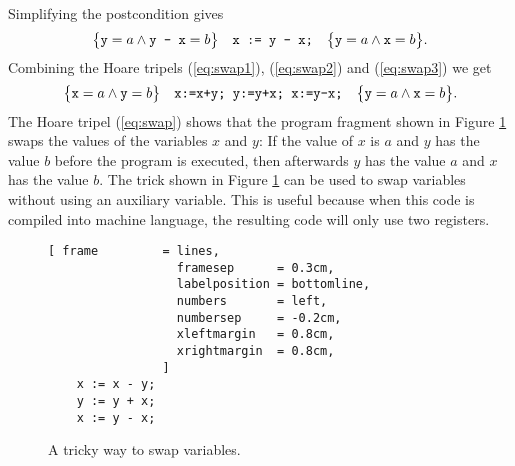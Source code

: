 Simplifying the postcondition gives
\begin{equation}
  \label{eq:swap3}
  \bigl\{\texttt{y} = a \wedge \texttt{y - x} = b\bigr\}\quad\texttt{x := y - x;}\quad\bigl\{ \texttt{y} = a \wedge \texttt{x} = b\bigr\}.   
\end{equation}
Combining the Hoare tripels (\ref{eq:swap1}), (\ref{eq:swap2}) and (\ref{eq:swap3})
we get
\begin{equation}
  \label{eq:swap}
  \bigl\{\texttt{x} = a \wedge \texttt{y} = b\bigr\}\quad\texttt{x:=x+y; y:=y+x; x:=y-x;}\quad\bigl\{ 
         \texttt{y} = a \wedge \texttt{x} = b\bigr\}.   
\end{equation}
The Hoare tripel (\ref{eq:swap}) shows that the program fragment shown in Figure
\ref{fig:swap} swaps the values of the variables $x$ and $y$: If the value of 
$x$ is $a$ and $y$ has the value $b$ before the program is executed, then afterwards
$y$ has the value $a$ and $x$ has the value $b$.  The trick shown in Figure
\ref{fig:swap} 
can be used to swap variables without using an auxiliary variable.  This is useful because when this
code is compiled into machine language, the resulting code will only use two registers.


\begin{figure}[!ht]
\centering
\begin{Verbatim}[ frame         = lines, 
                  framesep      = 0.3cm, 
                  labelposition = bottomline,
                  numbers       = left,
                  numbersep     = -0.2cm,
                  xleftmargin   = 0.8cm,
                  xrightmargin  = 0.8cm,
                ]
    x := x - y;
    y := y + x;
    x := y - x;
\end{Verbatim}
\vspace*{-0.3cm}
\caption{A tricky way to swap variables.}
\label{fig:swap}
\end{figure}



